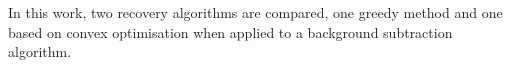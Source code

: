 






In this work, two recovery algorithms are compared, one greedy method and one based on convex optimisation when applied to a background subtraction algorithm. 

